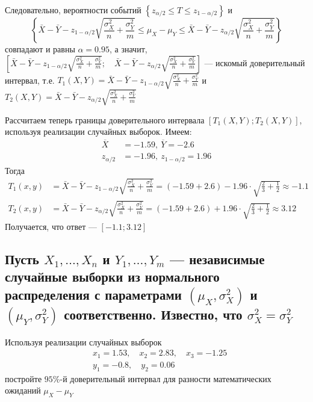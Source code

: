 \documentclass{article}
\begin{document}
Следовательно, вероятности событий $\left\{z_{\alpha / 2} \leqslant T \leqslant z_{1-\alpha / 2}\right\}$ и $$\left\{\bar{X}-\bar{Y}-z_{1-\alpha / 2} \sqrt{\frac{\sigma_{X}^{2}}{n}+\frac{\sigma_{Y}^{2}}{m}} \leqslant \mu_{X}-\mu_{Y} \leqslant \bar{X}-\bar{Y}-z_{\alpha / 2} \sqrt{\frac{\sigma_{X}^{2}}{n}+\frac{\sigma_{Y}^{2}}{m}}\right\}$$ совпадают и равны $\alpha=0.95$, а значит, $\left[\bar{X}-\bar{Y}-z_{1-\alpha / 2} \sqrt{\frac{\sigma_{X}^{2}}{n}+\frac{\sigma_{Y}^{2}}{m}} ; \quad \bar{X}-\bar{Y}-z_{\alpha / 2} \sqrt{\frac{\sigma_{X}^{2}}{n}+\frac{\sigma_{Y}^{2}}{m}}\right]$ — искомый доверительный интервал, т.е. $T_{1}(X, Y)=\bar{X}-\bar{Y}-z_{1-\alpha / 2} \sqrt{\frac{\sigma_{X}^{2}}{n}+\frac{\sigma_{Y}^{2}}{m}}$ и $T_{2}(X, Y)=\bar{X}-\bar{Y}-z_{\alpha / 2} \sqrt{\frac{\sigma_{X}^{2}}{n}+\frac{\sigma_{Y}^{2}}{m}}$

Рассчитаем теперь границы доверительного интервала $\left[T_{1}(X, Y) ; T_{2}(X, Y)\right]$, используя реализации случайных выборок. Имеем:
\begin{equation*}
    \begin{aligned}
        \overline{X}&=-1.59,\ \overline{Y}=-2.6\\
        z_{\alpha / 2}&=-1.96,\ z_{1-\alpha / 2}=1.96
    \end{aligned}
\end{equation*}
Тогда
\begin{equation*}
    \begin{aligned}
        T_{1}(x, y)&=\bar{X}-\bar{Y}-z_{1-\alpha / 2} \sqrt{\frac{\sigma_{X}^{2}}{n}+\frac{\sigma_{Y}^{2}}{m}}=(-1.59+2.6)-1.96\cdot\sqrt{\frac{2}{3}+\frac{1}{2}}\approx-1.1\\
        T_{2}(x, y)&=\bar{X}-\bar{Y}-z_{\alpha / 2} \sqrt{\frac{\sigma_{X}^{2}}{n}+\frac{\sigma_{Y}^{2}}{m}}=(-1.59+2.6)+1.96\cdot\sqrt{\frac{2}{3}+\frac{1}{2}}\approx3.12
    \end{aligned}
\end{equation*}
Получается, что ответ — $[-1.1;3.12]$

\subsection{Пусть $X_{1}, \ldots, X_{n}$ и $Y_{1}, \ldots, Y_{m}$ — независимые случайные выборки из нормального распределения с параметрами $\left(\mu_{X}, \sigma_{X}^{2}\right)$ и $\left(\mu_{Y}, \sigma_{Y}^{2}\right)$ соответственно. Известно, что $\sigma_{X}^{2}=\sigma_{Y}^{2}$}
Используя реализации случайных выборок
\begin{equation*}
    \begin{aligned}
        & x_{1}=1.53, \quad x_{2}=2.83, \quad x_{3}=-1.25 \\
        & y_{1}=-0.8, \quad y_{2}=0.06
    \end{aligned}
\end{equation*}
постройте $95 \%$-й доверительный интервал для разности математических ожиданий $\mu_{X}-\mu_{Y}$
\end{document}
